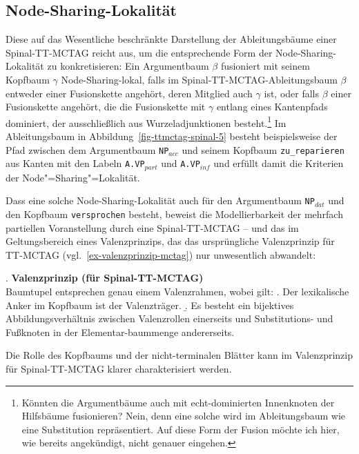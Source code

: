 \subsection{Node-Sharing-Lokalität}

Diese auf das Wesentliche beschränkte Darstellung der Ableitungsbäume einer Spinal-TT-MCTAG reicht aus, um die entsprechende Form der Node-Sharing-Lokalität zu konkretisieren: Ein Argumentbaum $\beta$ fusioniert mit seinem Kopfbaum $\gamma$ Node-Sharing-lokal, falls im Spinal-TT-MCTAG-Ablei\-tungs\-baum $\beta$ entweder einer Fusionskette angehört, deren Mitglied auch $\gamma$ ist, oder falls $\beta$ einer Fusionskette angehört, die die Fusionskette mit $\gamma$ entlang eines Kantenpfads dominiert, der ausschlie\ss lich aus Wurzeladjunktionen besteht.\footnote{Könnten die Argumentbäume auch mit echt-dominierten Innenknoten der Hilfsbäume fusionieren? Nein, denn eine solche  wird im Ableitungsbaum wie eine Substitution repräsentiert. Auf diese Form der Fusion möchte ich hier, wie bereits angekündigt, nicht genauer eingehen.} Im Ableitungsbaum in Abbildung~\ref{fig-ttmctag-spinal-5} besteht beispielsweise der Pfad zwischen dem Argumentbaum {\tt NP$_{\mathit{acc}}$} und seinem Kopfbaum {\tt zu\_reparieren} aus Kanten mit den Labeln {\tt A.VP$_{\mathit{part}}$} und {\tt A.VP$_{\mathit{inf}}$} und erfüllt damit die Kriterien der Node"=Sharing"=Lokalität. 

Dass eine solche Node-Sharing-Lokalität auch für den Argumentbaum {\tt NP$_{\mathit{dat}}$} und den Kopfbaum {\tt versprochen} besteht, beweist die Modellierbarkeit der mehrfach partiellen Voranstellung durch eine Spinal-TT-MCTAG -- und das im Geltungsbereich eines Valenzprinzips, das das ursprüngliche Valenzprinzip für TT-MCTAG (vgl.\ \ref{ex-valenzprinzip-mctag}) nur unwesentlich abwandelt:

\ex. \label{ex-valenzprinzip-spinal-tt-mctag}{\bf Valenzprinzip (für Spinal-TT-MCTAG)} \\ 
Baumtupel entsprechen genau einem Valenzrahmen, wobei gilt:
\a. Der lexikalische Anker im Kopfbaum ist der Valenzträger.
\b. Es besteht ein bijektives Abbildungsverhältnis zwischen Valenzrollen einerseits und Substitutions- und Fu\ss knoten in der Elementar-\linebreak baummenge andererseits.

Die Rolle des Kopfbaums und der nicht-terminalen Blätter kann im Valenzprinzip für Spinal-TT-MCTAG klarer charakterisiert werden.

